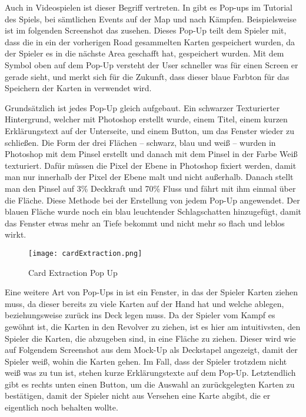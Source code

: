 Auch in Videospielen ist dieser Begriff vertreten. In \FF gibt es Pop-ups im Tutorial des Spiels, bei sämtlichen Events auf der Map und nach Kämpfen. Beispielsweise ist im folgenden Screenshot das  zusehen. Dieses Pop-Up teilt dem Spieler mit, dass die in ein der vorherigen Road gesammelten Karten gespeichert wurden, da der Spieler es in die nächste Area geschafft hat, gespeichert wurden. Mit dem Symbol oben auf dem Pop-Up versteht der User schneller was für einen Screen er gerade sieht, und merkt sich für die Zukunft, dass dieser blaue Farbton für das Speichern der Karten in \FF verwendet wird.

Grundsätzlich ist jedes Pop-Up gleich aufgebaut. Ein schwarzer Texturierter Hintergrund, welcher mit Photoshop erstellt wurde, einem Titel, einem kurzen Erklärungstext auf der Unterseite, und einem Button, um das Fenster wieder zu schließen. Die Form der drei Flächen – schwarz, blau und weiß – wurden in Photoshop mit dem  Pinsel erstellt und danach mit dem
 Pinsel in der Farbe Weiß texturiert. Dafür müssen die Pixel der Ebene in Photoshop fixiert werden, damit man nur innerhalb der Pixel der Ebene malt und nicht außerhalb. Danach stellt man den Pinsel auf 3\% Deckkraft und 70\% Fluss und fährt mit ihm einmal über die Fläche. Diese Methode bei der Erstellung von jedem Pop-Up angewendet. Der blauen Fläche wurde noch ein blau leuchtender Schlagschatten hinzugefügt, damit das Fenster etwas mehr an Tiefe bekommt und nicht mehr so flach und leblos wirkt.

\begin{figure}[H]
    \centering
    \texttt{[image: cardExtraction.png]}
    \caption{Card Extraction Pop Up}
\end{figure}

Eine weitere Art von Pop-Ups in \FF ist ein Fenster, in das der Spieler Karten ziehen muss, da dieser bereits zu viele Karten auf der Hand hat und welche ablegen, beziehungsweise zurück ins Deck legen muss. Da der Spieler vom Kampf es gewöhnt ist, die Karten in den Revolver zu ziehen, ist es hier am intuitivsten, den Spieler die Karten, die abzugeben sind, in eine Fläche zu ziehen. Dieser wird wie auf Folgendem Screenshot aus dem Mock-Up als Deckstapel angezeigt, damit der Spieler weiß, wohin die Karten gehen. Im Fall, dass der Spieler trotzdem nicht weiß was zu tun ist, stehen kurze Erklärungstexte auf dem Pop-Up. Letztendlich gibt es rechts unten einen Button, um die Auswahl an zurückgelegten Karten zu bestätigen, damit der Spieler nicht aus Versehen eine Karte abgibt, die er eigentlich noch behalten wollte.

